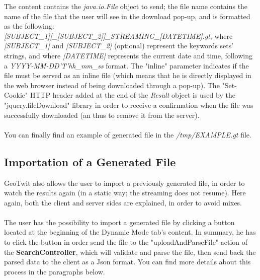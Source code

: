 \documentclass[a4paper,11pt]{report}
\begin{document}
The content contains the \emph{java.io.File} object to send; the file name contains the name of the file that the user will see in the download pop-up, and is formatted as the following: \\\emph{[SUBJECT\_1][\_[SUBJECT\_2]]\_STREAMING\_[DATETIME].gt}, where \emph{[SUBJECT\_1]} and \emph{[SUBJECT\_2]} (optional) represent the keywords sets' strings, and where \emph{[DATETIME]} represents the current date and time, following a \emph{YYYY-MM-DD'T'hh\_mm\_ss} format. The "inline" parameter indicates if the file must be served as an inline file (which means that he is directly displayed in the web browser instead of being downloaded through a pop-up).
\newpage
The "Set-Cookie" HTTP header added at the end of the \emph{Result} object is used by the "jquery.fileDownload" library in order to receive a confirmation when the file was successfully downloaded (an thus to remove it from the server).\\\\
You can finally find an example of generated file in the \emph{/tmp/EXAMPLE.gt} file.

\subsection{Importation of a Generated File}
GeoTwit also allows the user to import a previously generated file, in order to watch the results again (in a static way; the streaming does not resume). Here again, both the client and server sides are explained, in order to avoid mixes.\\\\
The user has the possibility to import a generated file by clicking a button located at the beginning of the Dynamic Mode tab's content. In summary, he has to click the button in order send the file to the "uploadAndParseFile" action of the \textbf{SearchController}, which will validate and parse the file, then send back the parsed data to the client as a Json format. You can find more details about this process in the paragraphs below.
\bigskip
\end{document}
